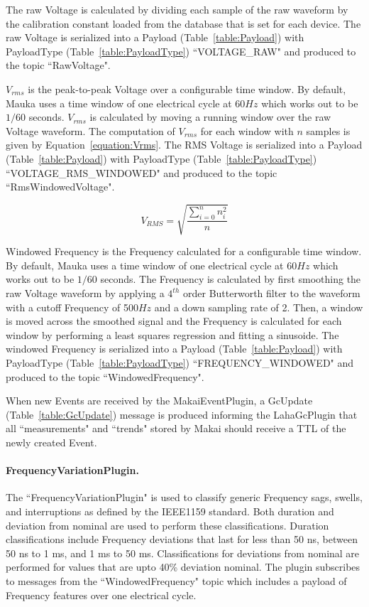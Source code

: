 The raw Voltage is calculated by dividing each sample of the raw waveform by the calibration constant loaded from the database that is set for each device. The raw Voltage  is serialized into a Payload (Table~\ref{table:Payload}) with PayloadType (Table~\ref{table:PayloadType}) ``VOLTAGE\_RAW" and produced to the topic ``RawVoltage".

$V_{rms}$ is the peak-to-peak Voltage over a configurable time window. By default, Mauka uses a time window of one electrical cycle at 60$Hz$ which works out to be $1/60$ seconds. $V_{rms}$ is calculated by moving a running window over the raw Voltage waveform. The computation of $V_{rms}$ for each window with $n$ samples is given by Equation~\ref{equation:Vrms}. The RMS Voltage  is serialized into a Payload (Table~\ref{table:Payload}) with PayloadType (Table~\ref{table:PayloadType}) ``VOLTAGE\_RMS\_WINDOWED" and produced to the topic ``RmsWindowedVoltage".

\begin{equation}
\label{equation:Vrms}
	V_{RMS} = \sqrt{\frac{\sum_{i=0}^{n} n_{i}^2}{n}}
\end{equation}

Windowed Frequency is the Frequency calculated for a configurable time window. By default, Mauka uses a time window of one electrical cycle at 60$Hz$ which works out to be $1/60$ seconds. The Frequency is calculated by first smoothing the raw Voltage waveform by applying a $4^{th}$ order Butterworth filter to the waveform with a cutoff Frequency of 500$Hz$ and a down sampling rate of 2. Then, a window is moved across the smoothed signal and the Frequency is calculated for each window by performing a least squares regression and fitting a sinusoide. The windowed Frequency is serialized into a Payload (Table~\ref{table:Payload}) with PayloadType (Table~\ref{table:PayloadType}) ``FREQUENCY\_WINDOWED" and produced to the topic ``WindowedFrequency".

When new Events are received by the MakaiEventPlugin, a GcUpdate (Table~\ref{table:GcUpdate}) message is produced informing the LahaGcPlugin that all ``measurements" and ``trends" stored by Makai should receive a TTL of the newly created Event.

\paragraph{FrequencyVariationPlugin.}
The ``FrequencyVariationPlugin" is used to classify generic Frequency sags, swells, and interruptions as defined by the IEEE1159 standard\cite{IEEE:2018:1159D3}. Both duration and deviation from nominal are used to perform these classifications. Duration classifications include Frequency deviations that last for less than 50 ns, between 50 ns to 1 ms, and 1 ms to 50 ms. Classifications for deviations from nominal are performed for values that are upto 40\% deviation nominal. The plugin subscribes to messages from the ``WindowedFrequency" topic which includes a payload of Frequency features over one electrical cycle.

